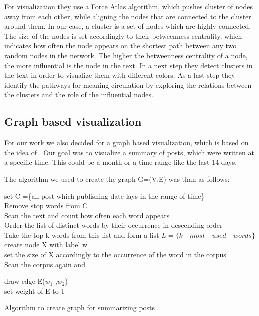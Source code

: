  For visualization they use a Force Atlas algorithm, which pushes cluster of nodes away from each other, while aligning the nodes that are connected to the cluster around them. In our case, a cluster is a set of nodes which are highly connected. The size of the nodes is set accordingly to their betweenness centrality, which indicates how often the node appears on the shortest path between any two random nodes in the network. The higher the betweenness centrality of a node, the more influential is the node in the text. In a next step they detect clusters in the text in order to visualize them with different colors. As a last step they identify the pathways for meaning circulation by exploring the relations between the clusters and the role of the influential nodes.

\newpage
\subsection{Graph based visualization} \label{sec:graphVisualization}

For our work we also decided for a graph based visualization, which is based on the idea of \cite{visualiuationCorpus3}. Our goal was to visualize a summary of posts, which were written at a specific time. This could be a month or a time range like the last 14 days. 


The algorithm we used to  create the graph G=(V,E) was than as follows: \\

\begin{algorithm}
	
	set C =\{all post which publishing date lays in the range of time\} \\
	Remove stop words from C \\
	Scan the text and count how often each word appears \\
	Order the list of distinct words by their occurrence in descending order \\
	Take the top k words from this list and form a list $  L = \{ k  \quad most \quad used  \quad words\}$ \\
	{
		create node X with label w \\
		set the size of X accordingly to the occurrence of the word in the corpus  \\
	}
	Scan the corpus again and \\
	{
		{	
			draw edge E($w_1$ ,$w_2$)\\
			set weight of E to 1 \\
			
		}
		
	}
	
	\caption{Algorithm to create graph for summarizing  posts}
\end{algorithm}

